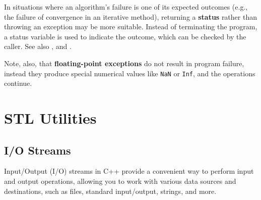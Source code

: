 \begin{observationblock}
    In situations where an algorithm's failure is one of its expected outcomes (e.g., the failure of
    convergence in an iterative method), returning a \textbf{status} rather than throwing an exception may be
    more suitable. Instead of terminating the program, a status variable is used to indicate the
    outcome, which can be checked by the caller. See also  ,  and .
\end{observationblock}

Note, also, that \textbf{floating-point exceptions} do not result in program failure, instead they produce special numerical values like \texttt{NaN} or \texttt{Inf}, and the operations continue. 


\section{STL Utilities}

\subsection{I/O Streams}

Input/Output (I/O) streams in C++ provide a convenient way to perform input and output
operations, allowing you to work with various data sources and destinations, such as files,
standard input/output, strings, and more.

